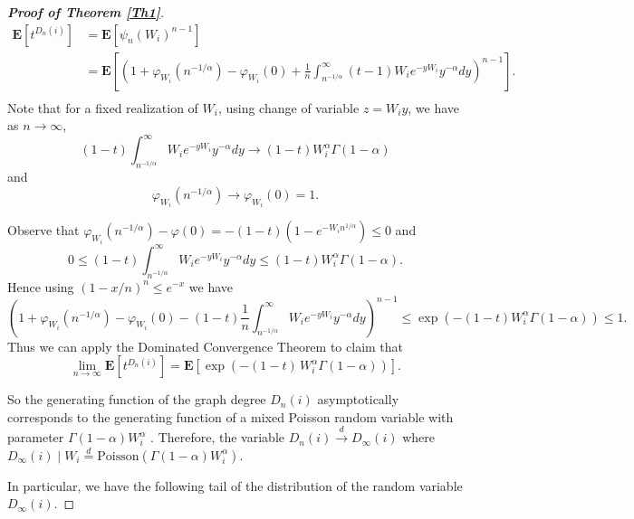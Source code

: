 \documentclass[11pt, reqno]{amsart}
\numberwithin{equation}{section}
\theoremstyle{plain} %
\theoremstyle{definition} %
\newcommand{\prob}{\mathbf{P}}
\newcommand{\E}{\mathbf{E}}
\begin{document}
\begin{proof}[{\bf Proof of Theorem \ref{Th1}}]
   \begin{align*}
  \E\left[ t^{D_n(i)} \right] &=  \E\left[ \psi_n(W_i)^{n-1} \right]\\
   &= \E\left[ \left(  1 + \varphi_{W_i}(n^{-1/\alpha})-\varphi_{W_i}(0) + \frac{1}{n}\int_{n^{-1/\alpha}}^\infty (t-1) W_{i} e^{-yW_{i}} y^{-\alpha} dy\right)^{n-1} \right].\\
  \end{align*}
  Note that for a fixed realization of  $W_i$, using change of variable $z= W_i y$, we have as $n\to \infty$, $$(1-t)\int_{n^{-1/\alpha}}^\infty  W_{i} e^{-yW_{i}} y^{-\alpha} dy\to (1-t)W_i^\alpha \Gamma(1-\alpha)$$
  and 
  $$\varphi_{W_i}(n^{-1/\alpha})\to \varphi_{W_i}(0)=1.$$
  

Observe that $\varphi_{W_i}(n^{-1/\alpha})-\varphi(0)= -(1-t)(1-e^{-W_in^{1/\alpha}})\le 0$ and
$$0\le (1-t)\int_{n^{-1/\alpha}}^\infty  W_{i} e^{-yW_{i}} y^{-\alpha} dy\le (1-t) W_i^{\alpha}\Gamma(1-\alpha).$$
Hence using $(1-x/n)^n \le e^{-x}$ we have $$\left(  1 + \varphi_{W_i}(n^{-1/\alpha})-\varphi_{W_i}(0) -(1-t)\frac{1}{n}\int_{n^{-1/\alpha}}^\infty  W_{i} e^{-yW_{i}} y^{-\alpha} dy\right)^{n-1}\le \exp\left(- (1-t)W_i^{\alpha} \Gamma(1-\alpha)\right)\le 1.$$
Thus we can apply the Dominated Convergence Theorem to claim that
$$
     \lim_{n\to \infty}\E\left[ t^{D_n(i)} \right] = \E\left[ \exp\left(-(1-t) \, W_i^{\alpha} \Gamma(1-\alpha)\right)  \right].
$$

So the generating function of the graph degree $D_n(i)$ asymptotically corresponds to the generating function of a mixed Poisson random variable with parameter  $ \Gamma(1-\alpha)  W_i^{\alpha}$ .
Therefore, the variable $D_n(i)\overset{d}\rightarrow D_{\infty}(i)$ where $D_{\infty}(i)\mid W_i\overset{d}= \mathrm{Poisson}\left( \Gamma(1-\alpha) W_i^{\alpha} \right)$. 

In particular, we have the following tail of the distribution of the random variable $D_{\infty}(i)$. 


\end{proof}
\end{document}
